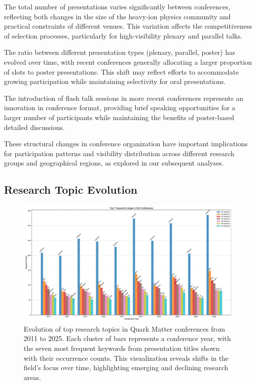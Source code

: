 \documentclass[a4paper,11pt]{article}
\begin{document}
The total number of presentations varies significantly between conferences, reflecting both changes in the size of the heavy-ion physics community and practical constraints of different venues. This variation affects the competitiveness of selection processes, particularly for high-visibility plenary and parallel talks.

The ratio between different presentation types (plenary, parallel, poster) has evolved over time, with recent conferences generally allocating a larger proportion of slots to poster presentations. This shift may reflect efforts to accommodate growing participation while maintaining selectivity for oral presentations.

The introduction of flash talk sessions in more recent conferences represents an innovation in conference format, providing brief speaking opportunities for a larger number of participants while maintaining the benefits of poster-based detailed discussions.

These structural changes in conference organization have important implications for participation patterns and visibility distribution across different research groups and geographical regions, as explored in our subsequent analyses.

\subsection{Research Topic Evolution}

\begin{figure}[H]
\centering
\includegraphics[width=\textwidth]{figures/top_keywords.pdf}
\caption{Evolution of top research topics in Quark Matter conferences from 2011 to 2025. Each cluster of bars represents a conference year, with the seven most frequent keywords from presentation titles shown with their occurrence counts. This visualization reveals shifts in the field's focus over time, highlighting emerging and declining research areas.}
\label{fig:keywords}
\end{figure}
\end{document}
